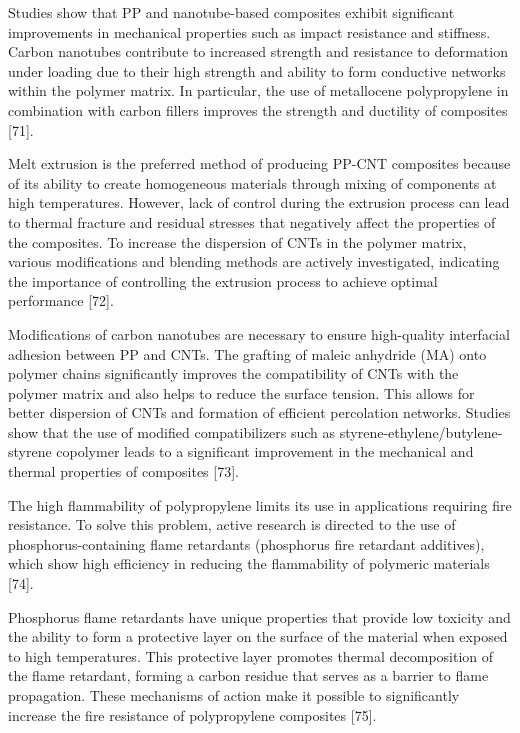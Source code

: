 \begin{multicols}{2}
Studies show that PP and nanotube-based composites exhibit significant
improvements in mechanical properties such as impact resistance and
stiffness. Carbon nanotubes contribute to increased strength and
resistance to deformation under loading due to their high strength and
ability to form conductive networks within the polymer matrix. In
particular, the use of metallocene polypropylene in combination with
carbon fillers improves the strength and ductility of composites
{[}71{]}.

Melt extrusion is the preferred method of producing PP-CNT composites
because of its ability to create homogeneous materials through mixing of
components at high temperatures. However, lack of control during the
extrusion process can lead to thermal fracture and residual stresses
that negatively affect the properties of the composites. To increase the
dispersion of CNTs in the polymer matrix, various modifications and
blending methods are actively investigated, indicating the importance of
controlling the extrusion process to achieve optimal performance
{[}72{]}.

Modifications of carbon nanotubes are necessary to ensure high-quality
interfacial adhesion between PP and CNTs. The grafting of maleic
anhydride (MA) onto polymer chains significantly improves the
compatibility of CNTs with the polymer matrix and also helps to reduce
the surface tension. This allows for better dispersion of CNTs and
formation of efficient percolation networks. Studies show that the use
of modified compatibilizers such as styrene-ethylene/butylene-styrene
copolymer leads to a significant improvement in the mechanical and
thermal properties of composites {[}73{]}.

The high flammability of polypropylene limits its use in applications
requiring fire resistance. To solve this problem, active research is
directed to the use of phosphorus-containing flame retardants
(phosphorus fire retardant additives), which show high efficiency in
reducing the flammability of polymeric materials {[}74{]}.

Phosphorus flame retardants have unique properties that provide low
toxicity and the ability to form a protective layer on the surface of
the material when exposed to high temperatures. This protective layer
promotes thermal decomposition of the flame retardant, forming a carbon
residue that serves as a barrier to flame propagation. These mechanisms
of action make it possible to significantly increase the fire resistance
of polypropylene composites {[}75{]}.


\end{multicols}
